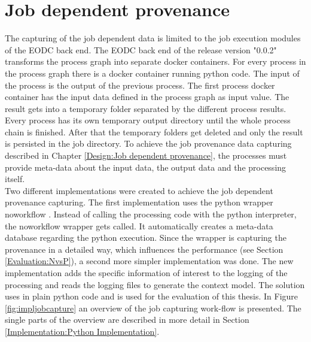 \documentclass[draft,final]{vutinfth} %
\begin{document}
\section{Job dependent provenance}\label{Implementation:Job dependent provenance}
The capturing of the job dependent data is limited to the job execution modules of the EODC back end. The EODC back end of the release version "0.0.2" transforms the process graph into separate docker containers. For every process in the process graph there is a docker container running python code. The input of the process is the output of the previous process. The first process docker container has the input data defined in the process graph as input value. The result gets into a temporary folder separated by the different process results. Every process has its own temporary output directory until the whole process chain is finished. After that the temporary folders get deleted and only the result is persisted in the job directory.
To achieve the job provenance data capturing described in Chapter \ref{Design:Job dependent provenance}, the processes must provide meta-data about the input data, the output data and the processing itself. \\ 
Two different implementations were created to achieve the job dependent provenance capturing. The first implementation uses the python wrapper noworkflow \cite{c9e0604becba42af96a9cb0a6f60018b}. Instead of calling the processing code with the python interpreter, the noworkflow wrapper gets called. It automatically creates a meta-data database regarding the python execution. Since the wrapper is capturing the provenance in a detailed way, which influences the performance (see Section \ref{Evaluation:NvsP}), a second more simpler implementation was done. The new implementation adds the specific information of interest to the logging of the processing and reads the logging files to generate the context model. The solution uses in plain python code and is used for the evaluation of this thesis. In Figure \ref{fig:impljobcapture} an overview of the job capturing work-flow is presented. The single parts of the overview are described in more detail in Section \ref{Implementation:Python Implementation}.  
\end{document}
